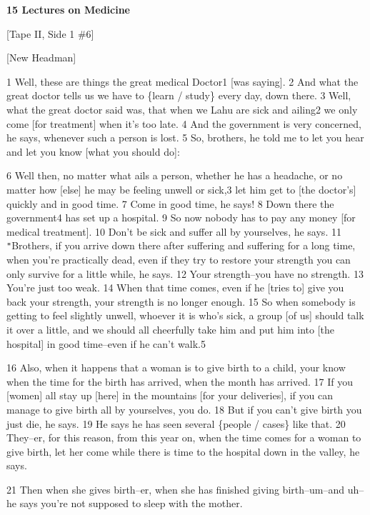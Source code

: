 
\textbf{15 Lectures on Medicine }

[Tape II, Side 1 \#6]

[New Headman]

1 Well, these are things the great medical Doctor1 [was saying]. 2 And what the
great doctor tells us we have to \{learn / study\} every day, down there. 3 Well,
what the great doctor said was, that when we Lahu are sick and ailing2 we only
come [for treatment] when it's too late. 4 And the government is very concerned,
he says, whenever such a person is lost. 5 So, brothers, he told me to let you
hear and let you know [what you should do]:

6 Well then, no matter what ails a person, whether he has a headache, or no matter
how [else] he may be feeling unwell or sick,3 let him get to [the doctor's] quickly
and in good time. 7 Come in good time, he says! 8 Down there the government4 has
set up a hospital. 9 So now nobody has to pay any money [for medical treatment].
10 Don't be sick and suffer all by yourselves, he says. 11 \texttt{"}Brothers,
if you arrive down there after suffering and suffering for a long time, when you're
practically dead, even if they try to restore your strength you can only survive
for a little while, he says. 12 Your strength--you have no strength. 13 You're
just too weak. 14 When that time comes, even if he [tries to] give you back your
strength, your strength is no longer enough. 15 So when somebody is getting to
feel slightly unwell, whoever it is who's sick, a group [of us] should talk it
over a little, and we should all cheerfully take him and put him into [the hospital]
in good time--even if he can't walk.5

16 Also, when it happens that a woman is to give birth to a child, your know when
the time for the birth has arrived, when the month has arrived. 17 If you [women]
all stay up [here] in the mountains [for your deliveries], if you can manage to
give birth all by yourselves, you do. 18 But if you can't give birth you just die,
he says. 19 He says he has seen several \{people / cases\} like that. 20 They--er,
for this reason, from this year on, when the time comes for a woman to give birth,
let her come while there is time to the hospital down in the valley, he says.

21 Then when she gives birth--er, when she has finished giving birth--um--and uh--he
says you're not supposed to sleep with the mother.

